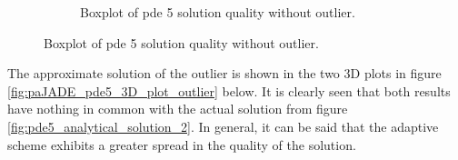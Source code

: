 \documentclass[./\jobname.tex]{subfiles}
\begin{document}
\begin{figure}[H]
\begin{subfigure}[b]{0.39\linewidth}
		\caption{Boxplot of \gls{pde} 5 solution quality without outlier. }
		\label{fig:paJADE_pde5_l2norm_boxplot_cleared}
	\end{subfigure}%
	\label{fig:paJADE_pde5_l2norm_boxplot_comparison}
\end{figure}

The approximate solution of the outlier is shown in the two 3D plots in figure \ref{fig:paJADE_pde5_3D_plot_outlier} below. It is clearly seen that both results have nothing in common with the actual solution from figure \ref{fig:pde5_analytical_solution_2}. In general, it can be said that the adaptive scheme exhibits a greater spread in the quality of the solution. 
\end{document}
